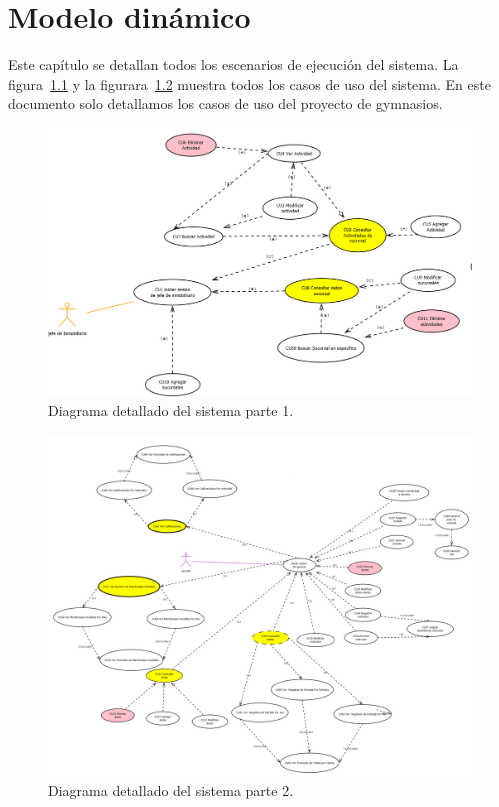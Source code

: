 \chapter{Modelo dinámico}	
\label{cap:modDinamico}

	Este capítulo se detallan todos los escenarios de ejecución del sistema. La figura~\ref{fig:CUcompleto1}  y la figurara~\ref{fig:CUcompleto2} muestra todos los casos de uso del sistema. En este documento solo detallamos los casos de uso del proyecto de gymnasios.

\begin{figure}[htbp]
	\begin{center}
		\includegraphics[angle=90, width=.7\textwidth]{images/cu/1J_inmobiliario}
		\caption{Diagrama detallado del sistema parte 1.}
		\label{fig:CUcompleto1}
	\end{center}
\end{figure}

\begin{figure}[htbp]
	\begin{center}
		\includegraphics[angle=90, width=.8\textwidth]{images/cu/2Gerente}
		\caption{Diagrama detallado del sistema parte 2.}
		\label{fig:CUcompleto2}
	\end{center}
\end{figure}


